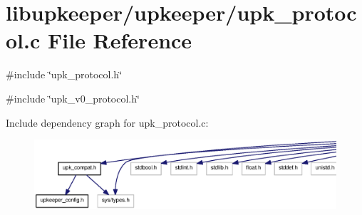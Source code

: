 \section{libupkeeper/upkeeper/upk\_\-protocol.c File Reference}
\label{upk__protocol_8c}
{\ttfamily \#include \char`\"{}upk\_\-protocol.h\char`\"{}}\par
{\ttfamily \#include \char`\"{}upk\_\-v0\_\-protocol.h\char`\"{}}\par
Include dependency graph for upk\_\-protocol.c:\nopagebreak
\begin{figure}[H]
\begin{center}
\leavevmode
\includegraphics[width=400pt]{upk__protocol_8c__incl}
\end{center}
\end{figure}
